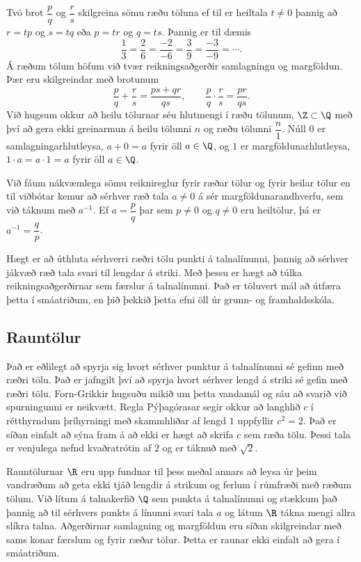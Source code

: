Tvö brot $\dfrac pq$ og $\dfrac
rs$ skilgreina sömu ræðu töluna ef til er heiltala $t\neq 0$ þannig að
$r=tp$ og $s=tq$ eða $p=tr$ og $q=ts$.  Þannig er til dæmis
$$
\dfrac 13=\dfrac 26=\dfrac {-2}{-6}=\dfrac 39=\dfrac{-3}{-9}=\cdots.
$$
Á ræðum tölum höfum við tvær reikningsaðgerðir samlagningu og
margföldun.  Þær eru skilgreindar með brotunum
$$
\dfrac pq+\dfrac rs=\dfrac{ps+qr}{qs}, \qquad \dfrac pq\cdot \dfrac
rs=\dfrac{pr}{qs}.
$$
Við hugsum okkur að heilu tölurnar séu hlutmengi í ræðu tölunum,
$\Z\subset \Q$ með því að gera ekki greinarmun á heilu tölunni $n$ 
og ræðu tölunni  $\dfrac n1$.   
Núll $0$ er samlagningarhlutleysa, $a+0=a$ fyrir öll $a\in \Q$,
og $1$ er  margföldunarhlutleysa, $1\cdot a=a\cdot 1=a$ fyrir öll $a\in \Q$.


Við fáum nákvæmlega sömu reiknireglur fyrir ræðar tölur og fyrir
heilar  tölur en til viðbótar kemur að sérhver ræð tala $a\neq 0$ á sér
margföldunarandhverfu, sem við táknum með $a^{-1}$.  Ef $a=\dfrac pq$
þar sem $p\neq 0$ og $q\neq 0$ eru heiltölur, þá er $a^{-1}=\dfrac
qp$.   


Hægt er að úthluta sérhverri ræðri tölu punkti á talnalínunni,
þannig að sérhver jákvæð ræð tala svari til lengdar á striki.  Með
þessu er hægt  að túlka reikningsaðgerðirnar sem færslur á
talnalínunni.  Það er töluvert mál að útfæra þetta í smáatriðum, en
þið þekkið þetta efni öll úr grunn- og framhaldsskóla.


\subsection*{Rauntölur}

Það er eðlilegt að spyrja sig hvort sérhver punktur á talnalínunni 
sé gefinn með ræðri tölu.  Það er jafngilt því að spyrja hvort sérhver
lengd á striki sé gefin með ræðri tölu.  Forn-Grikkir hugsuðu mikið um
þetta vandamál og sáu að svarið við spurningunni er neikvætt.  Regla
Pýþagórasar segir okkur að langhlið $c$ í rétthyrndum þríhyrningi með
skammhliðar af lengd $1$ uppfyllir $c^2=2$.  Það er síðan einfalt að
sýna fram á að ekki er hægt að skrifa $c$ sem ræða tölu.  Þessi tala
er venjulega nefnd kvaðratrótin af $2$ og er táknuð með $\sqrt 2$.

Rauntölurnar $\R$ eru upp fundnar til þess meðal annars að leysa úr
þeim vandræðum að geta ekki tjáð lengdir á strikum og ferlum 
í rúmfræði með ræðum tölum.   Við lítum á talnakerfið $\Q$ sem punkta
á  talnalínunni
og stækkum það þannig að til sérhvers punkts á línunni svari tala $a$
og látum $\R$ tákna mengi allra slíkra talna.  Aðgerðirnar 
samlagning og margföldun eru síðan skilgreindar með sams konar færslum
og fyrir ræðar tölur.  Þetta er raunar ekki einfalt að gera í
smáatriðum.  

